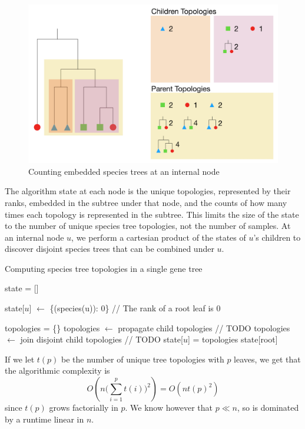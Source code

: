 \documentclass{article}
\begin{document}
\begin{figure}[H]
    \includegraphics[scale=0.5]{dp_alg}
    \centering
    \caption{Counting embedded species trees at an internal node}
    \label{fig:dp_alg}
\end{figure}

The algorithm state at each node is the unique topologies,
represented by their ranks, embedded in the subtree under that node, and the
counts of how many times each topology is represented in the subtree. This
limits the size of the state to the number of unique species tree topologies,
not the number of samples. At an internal node $u$, we perform a cartesian
product of the states of $u$'s children to discover disjoint species trees that
can be combined under $u$.

\begin{algorithm}
\label{alg:dp_alg}
    \caption{Computing species tree topologies in a single gene tree}
    \begin{algorithmic}
        \State state = []

        \State state[$u$] $\leftarrow$ \{(species(u)): 0\} // The rank of a root leaf is 0
        \EndFor

            \State topologies = \{\}
            \State topologies $\leftarrow$ propagate child topologies // TODO
            \State topologies $\leftarrow$ join disjoint child topologies // TODO
            \State state[$u$] = topologies
        \EndFor
        \State \Return state[root]
    \end{algorithmic}
\end{algorithm}
If we let $t(p)$ be the number of unique tree topologies with $p$ leaves,
we get that the algorithmic complexity is
\[
    O(n \big(\sum_{i=1}^p t(i)\big)^2) = O(n t(p)^2)
\]
since $t(p)$ grows factorially in $p$. We know however that $p \ll n$, so is
dominated by a runtime linear in $n$.
\end{document}
